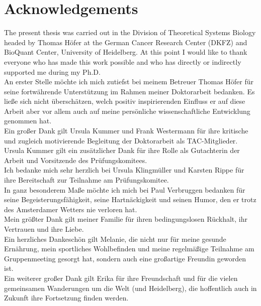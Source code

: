 \chapter*{Acknowledgements}
\thispagestyle{plain2}


The present thesis was carried out in the Division of Theoretical Systems Biology headed by 
Thomas H\"ofer at the German Cancer Research Center (DKFZ) and BioQuant Center, 
University of Heidelberg. At this point I would like to thank everyone who has made this work 
possible and who has directly or indirectly supported me during my Ph.D. \\

An erster Stelle m\"ochte ich mich zutiefst bei meinem Betreuer Thomas H\"ofer f\"ur seine fortw\"ahrende Unterst\"utzung im Rahmen meiner Doktorarbeit  bedanken. Es lie\ss{}e sich nicht \"ubersch\"atzen, welch positiv inspirierenden Einfluss er auf diese Arbeit aber vor allem auch auf meine pers\"onliche wissenschaftliche Ent\-wicklung genommen hat. \\

Ein gro\ss{}er Dank gilt Ursula Kummer und Frank Westermann f\"ur ihre kritische und zugleich motivierende Begleitung der Doktorarbeit als TAC-Mitglieder. Ursula Kummer gilt ein zus\"atzlicher Dank f\"ur ihre Rolle als Gutachterin der Arbeit und Vorsitzende des Pr\"ufungskomitees.\\

Ich bedanke mich sehr herzlich bei Ursula Klingm\"uller und Karsten Rippe f\"ur ihre Bereitschaft zur Teilnahme am Pr\"ufungskomitee.\\

In ganz besonderem Ma\ss{}e m\"{o}chte ich mich bei Paul Verbruggen bedanken f\"ur seine Begeisterungsf\"{a}higkeit, seine Hartn\"{a}ckigkeit und seinen Humor, den er trotz des Amsterdamer Wetters nie verloren hat.\\

Mein gr\"o\ss{}ter Dank gilt meiner Familie f\"{u}r ihren bedingungslosen R\"{u}ckhalt, ihr Vertrauen und ihre Liebe.\\

Ein herzliches Dankesch\"{o}n gilt Melanie, die nicht nur f\"{u}r meine gesunde Ern\"{a}hrung, mein sportliches Wohlbefinden und meine regelm\"{a}\ss{}ige Teilnahme am Gruppenmeeting gesorgt hat, sondern auch eine gro\ss{}artige Freundin geworden ist. \\      

Ein weiterer gro\ss{}er Dank gilt Erika f\"ur ihre Freundschaft und f\"ur die vielen gemeinsamen Wanderungen um die Welt (und Heidelberg), die hoffentlich auch in Zukunft ihre Fortsetzung finden werden.\\


